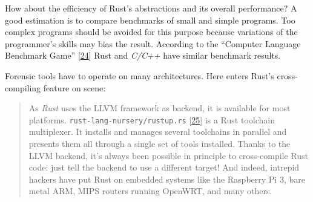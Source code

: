 How about the efficiency of Rust's abstractions and its overall
performance? A good estimation is to compare benchmarks of small and
simple programs. Too complex programs should be avoided for this purpose
because variations of the programmer's skills may bias the result.
According to the ``Computer Language Benchmark Game''
{[}\protect\hyperlink{fulgham2016}{24}{]} Rust and \emph{C/C++} have
similar benchmark results.

Forensic tools have to operate on many architectures. Here enters Rust's
cross-compiling feature on scene:

\begin{quote}
As \emph{Rust} uses the LLVM framework as backend, it is available for
most platforms. \texttt{rust-lang-nursery/rustup.rs}
{[}\protect\hyperlink{anderson2016}{25}{]} is a Rust toolchain
multiplexer. It installs and manages several toolchains in parallel and
presents them all through a single set of tools installed. Thanks to the
LLVM backend, it's always been possible in principle to cross-compile
Rust code: just tell the backend to use a different target! And indeed,
intrepid hackers have put Rust on embedded systems like the Raspberry Pi
3, bare metal ARM, MIPS routers running OpenWRT, and many others.
\end{quote}


